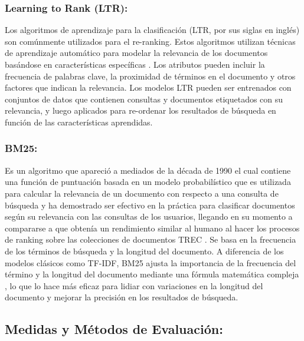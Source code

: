 \documentclass[
  10,
  openany]{book}
\begin{document}
\hypertarget{learning-to-rank-ltr}{%
\subsubsection{Learning to Rank (LTR):}\label{learning-to-rank-ltr}}

Los algoritmos de aprendizaje para la clasificación (LTR, por sus siglas en inglés) son comúnmente utilizados para el re-ranking. Estos algoritmos utilizan técnicas de aprendizaje automático para modelar la relevancia de los documentos basándose en características específicas \citep{büttcher2010}. Los atributos pueden incluir la frecuencia de palabras clave, la proximidad de términos en el documento y otros factores que indican la relevancia. Los modelos LTR pueden ser entrenados con conjuntos de datos que contienen consultas y documentos etiquetados con su relevancia, y luego aplicados para re-ordenar los resultados de búsqueda en función de las características aprendidas.

\hypertarget{bm25}{%
\subsubsection{BM25:}\label{bm25}}

Es un algoritmo que apareció a mediados de la década de 1990 el cual contiene una función de puntuación basada en un modelo probabilístico que es utilizada para calcular la relevancia de un documento con respecto a una consulta de búsqueda \citep{robertson2009} y ha demostrado ser efectivo en la práctica para clasificar documentos según su relevancia con las consultas de los usuarios, llegando en su momento a compararse a que obtenía un rendimiento similar al humano al hacer los procesos de ranking sobre las colecciones \citep{trotman2014} de documentos TREC \citep{trec:ex2005}. Se basa en la frecuencia de los términos de búsqueda y la longitud del documento. A diferencia de los modelos clásicos como TF-IDF, BM25 ajusta la importancia de la frecuencia del término y la longitud del documento mediante una fórmula matemática compleja \citep{zhai2016}, lo que lo hace más eficaz para lidiar con variaciones en la longitud del documento y mejorar la precisión en los resultados de búsqueda.

\hypertarget{evaluacion}{%
\subsection{Medidas y Métodos de Evaluación:}\label{evaluacion}}
\end{document}
